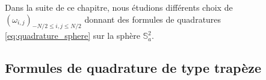 Dans la suite de ce chapitre, nous étudions différents choix de $(\omega_{i,j})_{-N/2 \leq i,j \leq N/2}$ donnant des formules de quadratures \eqref{eq:quadrature_sphere} sur la sphère $\mathbb{S}_a^2$.






















\subsection{Formules de quadrature de type trapèze}

